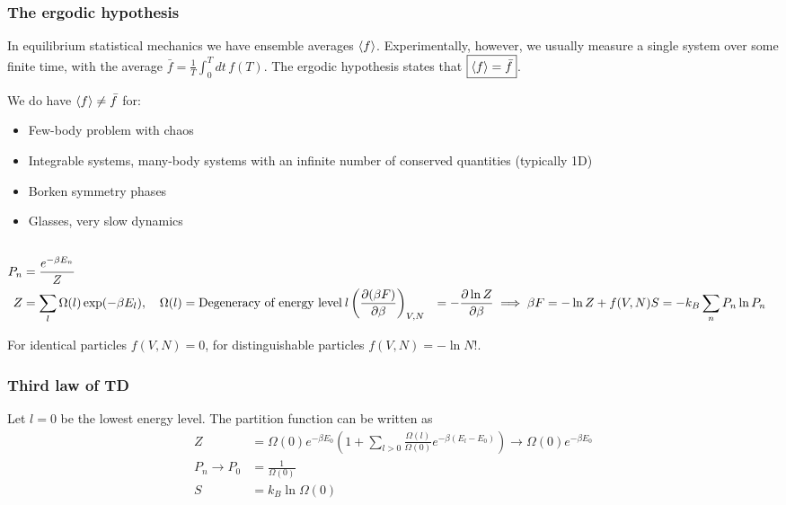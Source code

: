 \documentclass[a4paper, english, 12pt]{article}
\newcommand{\closed}[1]{\left( #1 \right)}
\begin{document}
\begin{multicols*}{2}
\subsubsection*{\scriptsize The ergodic hypothesis}
In equilibrium statistical mechanics we have ensemble averages $\expval{f}$. Experimentally, however, we usually measure a single system over some finite time, with the average $\bar{f}=\frac{1}{T} \int_0^T dt\,f(T)$. The ergodic hypothesis states that $\boxed{\expval{f}=\bar{f}}$. 

We do have $\expval{f}\neq\bar{f}$ for:
\begin{itemize}
    \item Few-body problem with chaos 
    \item Integrable systems, many-body systems with an infinite number of conserved quantities (typically 1D)
    \item Borken symmetry phases
    \item Glasses, very slow dynamics
\end{itemize} 


\subsection*{}

\begin{align*}
    P_n &= \frac{e^{-\beta E_n}}{Z} \\
    Z &= \sum_l \Omega(l)\exp(-\beta E_l),\quad \Omega(l)=\text{Degeneracy of energy level}\: l
    \closed{\pdv{(\beta F)}{\beta}}_{V,N} &= -\pdv{\ln Z}{\beta} \implies \beta F = -\ln Z + f(V,N)
    S &= -k_B \sum_n P_n \ln P_n
\end{align*}


For identical particles $f(V,N)=0$, for distinguishable particles $f(V,N)=-\ln N!$. 


\subsubsection*{\scriptsize Third law of TD}
Let $l=0$ be the lowest energy level. The partition function can be written as 
\begin{align*}
    Z &= \Omega(0)e^{-\beta E_0} \closed{1 + \sum_{l>0} \frac{\Omega(l)}{\Omega(0)} e^{-\beta(E_l-E_0)} } \to \Omega(0)e^{-\beta E_0}   \\
    P_n \to P_0 &= \frac{1}{\Omega(0)} \\ 
    S &= k_B \ln \Omega(0) 
\end{align*}


\end{multicols*}
\end{document}
